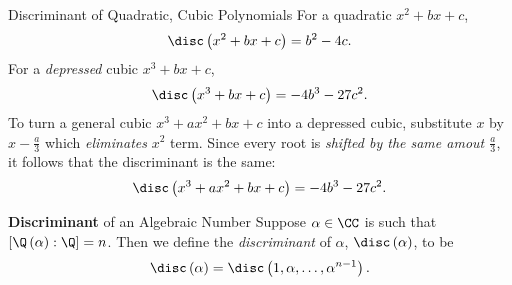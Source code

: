 \documentclass[pmath441]{subfiles}
\begin{document}
    \begin{example}{Discriminant of Quadratic, Cubic Polynomials}
        For a quadratic $x^{2}+bx+c$,
        \begin{equation*}
            \disc\left( x^{2}+bx+c \right) = b^{2}-4c.
        \end{equation*}
        For a \textit{depressed} cubic $x^{3}+bx+c$,
        \begin{equation*}
            \disc\left( x^{3}+bx+c \right) = -4b^{3}-27c^{2}.
        \end{equation*}
        To turn a general cubic $x^{3}+ax^{2}+bx+c$ into a depressed cubic, substitute $x$ by $x-\frac{a}{3}$ which \textit{eliminates} $x^{2}$ term. Since every root is \textit{shifted by the same amout $\frac{a}{3}$}, it follows that the discriminant is the same:
        \begin{equation*}
            \disc\left( x^{3}+ax^{2}+bx+c \right) = -4b^{3}-27c^{2}.
        \end{equation*}
    \end{example}

    \rruleline
    
    \begin{definition}{\textbf{Discriminant} of an Algebraic Number}
        Suppose $\alpha\in\CC$ is such that $\left[ \Q\left( \alpha \right):\Q \right] = n$. Then we define the \emph{discriminant} of $\alpha$, $\disc\left( \alpha \right)$, to be
        \begin{equation*}
            \disc\left( \alpha \right) = \disc\left( 1,\alpha,\ldots,\alpha^{n-1} \right).
        \end{equation*}
    \end{definition}
\end{document}
